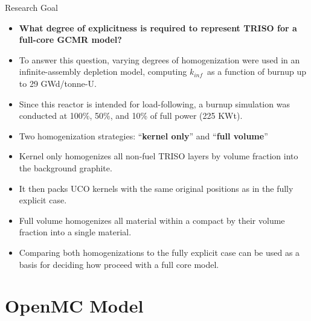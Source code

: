 \documentclass[9pt,t,aspectratio=169]{beamer}
\newcommand{\kinf}{$k_{inf}$}
\begin{document}
\begin{frame}{Research Goal}
    \begin{itemize}
        \item \textbf{What degree of explicitness is required to represent TRISO for a full-core GCMR model?}
        \item To answer this question, varying degrees of homogenization were used in an infinite-assembly depletion model, computing \kinf~as a function of burnup up to 29 GWd/tonne-U.
        \item Since this reactor is intended for load-following, a burnup simulation was conducted at 100\%, 50\%, and 10\% of full power (225 KWt).
        \item Two homogenization strategies: ``\textbf{kernel only}'' and ``\textbf{full volume}''
        \item Kernel only homogenizes all non-fuel TRISO layers by volume fraction into the background graphite.
        \item It then packs UCO kernels with the same original positions as in the fully explicit case.
        \item Full volume homogenizes all material within a compact by their volume fraction into a single material.
        \item Comparing both homogenizations to the fully explicit case can be used as a basis for deciding how proceed with a full core model.
    \end{itemize}
\end{frame}

\section{OpenMC Model}
\end{document}
